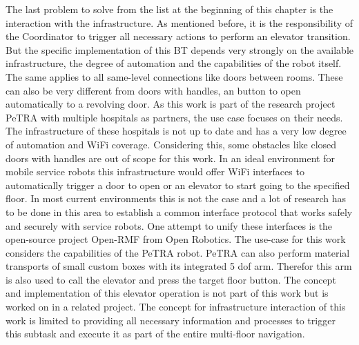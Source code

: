 The last problem to solve from the list at the beginning of this chapter is the interaction with the infrastructure. As mentioned before, it is the responsibility of the Coordinator to trigger all necessary actions to perform an elevator transition. But the specific implementation of this BT depends very strongly on the available infrastructure, the degree of automation and the capabilities of the robot itself. The same applies to all same-level connections like doors between rooms. These can also be very different from doors with handles, an button to open automatically to a revolving door. As this work is part of the research project PeTRA with multiple hospitals as partners, the use case focuses on their needs. The infrastructure of these hospitals is not up to date and has a very low degree of automation and WiFi coverage. Considering this, some obstacles like closed doors with handles are out of scope for this work. In an ideal environment for mobile service robots this infrastructure would offer WiFi interfaces to automatically trigger a door to open or an elevator to start going to the specified floor. In most current environments this is not the case and a lot of research has to be done in this area to establish a common interface protocol that works safely and securely with service robots. One attempt to unify these interfaces is the open-source project Open-RMF \cite{openrobotics_open-rmf_2023} from Open Robotics. The use-case for this work considers the capabilities of the PeTRA robot. PeTRA can also perform material transports of small custom boxes with its integrated 5 \gls{dof} arm. Therefor this arm is also used to call the elevator and press the target floor button. The concept and implementation of this elevator operation is not part of this work but is worked on in a related project. The concept for infrastructure interaction of this work is limited to providing all necessary information and processes to trigger this subtask and execute it as part of the entire multi-floor navigation.